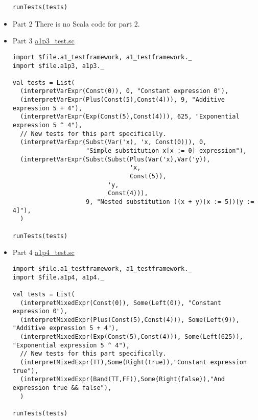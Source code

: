 \documentclass[11pt]{article}
\begin{document}
\begin{itemize}
\begin{verbatim}
runTests(tests)
\end{verbatim}

\item Part 2
\label{sec:org56424d6}
There is no Scala code for part 2.

\item Part 3
\label{sec:orgc51e931}
\href{./testing/a1/a1p3\_test.sc}{a1p3\_test.sc}
\begin{verbatim}
import $file.a1_testframework, a1_testframework._
import $file.a1p3, a1p3._

val tests = List(
  (interpretVarExpr(Const(0)), 0, "Constant expression 0"),
  (interpretVarExpr(Plus(Const(5),Const(4))), 9, "Additive expression 5 + 4"),
  (interpretVarExpr(Exp(Const(5),Const(4))), 625, "Exponential expression 5 ^ 4"),
  // New tests for this part specifically.
  (interpretVarExpr(Subst(Var('x), 'x, Const(0))), 0,
                    "Simple substitution x[x := 0] expression"),
  (interpretVarExpr(Subst(Subst(Plus(Var('x),Var('y)),
                                'x,
                                Const(5)),
                          'y,
                          Const(4))),
                    9, "Nested substitution ((x + y)[x := 5])[y := 4]"),
  )

runTests(tests)
\end{verbatim}

\item Part 4
\label{sec:org2658ce3}
\href{./testing/a1/a1p4\_test.sc}{a1p4\_test.sc}
\begin{verbatim}
import $file.a1_testframework, a1_testframework._
import $file.a1p4, a1p4._

val tests = List(
  (interpretMixedExpr(Const(0)), Some(Left(0)), "Constant expression 0"),
  (interpretMixedExpr(Plus(Const(5),Const(4))), Some(Left(9)), "Additive expression 5 + 4"),
  (interpretMixedExpr(Exp(Const(5),Const(4))), Some(Left(625)), "Exponential expression 5 ^ 4"),
  // New tests for this part specifically.
  (interpretMixedExpr(TT),Some(Right(true)),"Constant expression true"),
  (interpretMixedExpr(Band(TT,FF)),Some(Right(false)),"And expression true && false"),
  )

runTests(tests)
\end{verbatim}
\end{itemize}
\end{document}
